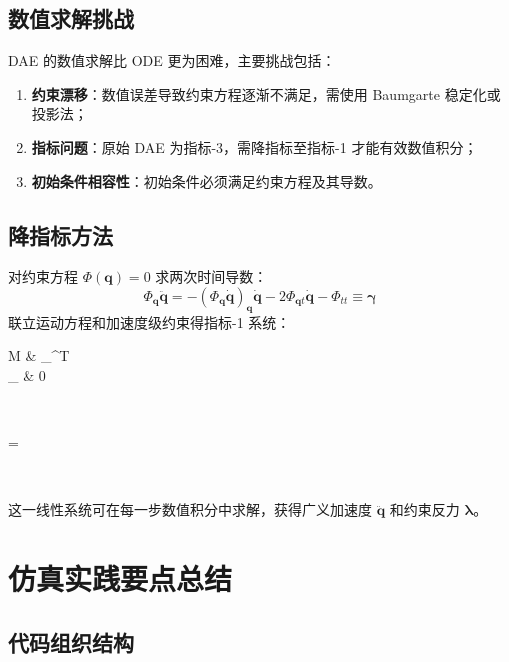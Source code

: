 \subsection{数值求解挑战}

DAE 的数值求解比 ODE 更为困难，主要挑战包括：
\begin{enumerate}
	\item \textbf{约束漂移}：数值误差导致约束方程逐渐不满足，需使用 Baumgarte 稳定化或投影法；
	\item \textbf{指标问题}：原始 DAE 为指标-3，需降指标至指标-1 才能有效数值积分；
	\item \textbf{初始条件相容性}：初始条件必须满足约束方程及其导数。
\end{enumerate}

\subsection{降指标方法}

对约束方程 $\Phi(\mathbf{q}) = 0$ 求两次时间导数：
\[
\Phi_{\mathbf{q}} \ddot{\mathbf{q}} = -\left( \Phi_{\mathbf{q}} \dot{\mathbf{q}} \right)_{\mathbf{q}} \dot{\mathbf{q}} - 2 \Phi_{\mathbf{q} t} \dot{\mathbf{q}} - \Phi_{tt} \equiv \boldsymbol{\gamma}
\]
联立运动方程和加速度级约束得指标-1 系统：
\begin{myformula}
	\begin{pmatrix} M & \Phi_{}^T \\ \Phi_{} & 0 \end{pmatrix}
	\begin{pmatrix}  \\ \boldsymbol{\lambda} \end{pmatrix}
	=
	\begin{pmatrix}  \\ \boldsymbol{\gamma} \end{pmatrix}
\end{myformula}

这一线性系统可在每一步数值积分中求解，获得广义加速度 $\ddot{\mathbf{q}}$ 和约束反力 $\boldsymbol{\lambda}$。

\section{仿真实践要点总结}

\subsection{代码组织结构}

